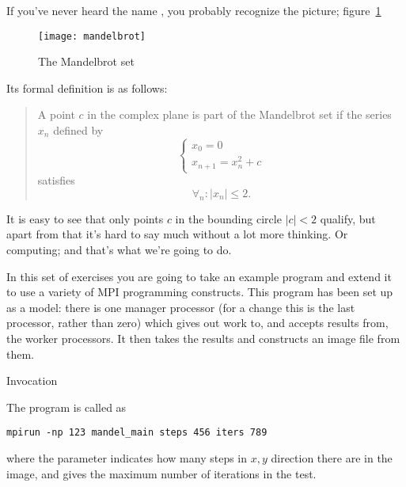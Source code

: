 
\label{sec:mpi-source}

If you've never heard the name , you
probably recognize the picture; figure~\ref{fig:mandelbrotset}
%
\begin{figure}[ht]
\texttt{[image: mandelbrot]}
\label{fig:mandelbrotset}
\caption{The Mandelbrot set}
\end{figure}
%
Its formal definition is as follows:
\begin{quotation}\noindent
  A point $c$ in the complex plane is part of the Mandelbrot set if 
  the series $x_n$ defined by 
  \[ 
  \begin{cases}
    x_0=0\\ x_{n+1}=x_n^2+c
  \end{cases}
  \] satisfies \[ \forall_n\colon |x_n|\leq 2. \]  
\end{quotation}
It is easy to see that only points $c$ in the bounding circle
$|c|< 2$ qualify, but
apart from that it's hard to say much without a lot more thinking.
Or computing; and that's what we're going to do.

In this set of exercises you are going to take an example program
 and extend it to use a variety of MPI programming
constructs.  This program has been set up as a
 model: there is one manager processor (for a
change this is the last processor, rather than zero) which gives out
work to, and accepts results from, the worker processors. It then
takes the results and constructs an image file from them.

 {Invocation}

The  program is called as
\begin{verbatim}
mpirun -np 123 mandel_main steps 456 iters 789
\end{verbatim}
where the  parameter indicates how many steps in $x,y$
direction there are in the image, and  gives the maximum
number of iterations in the  test.

